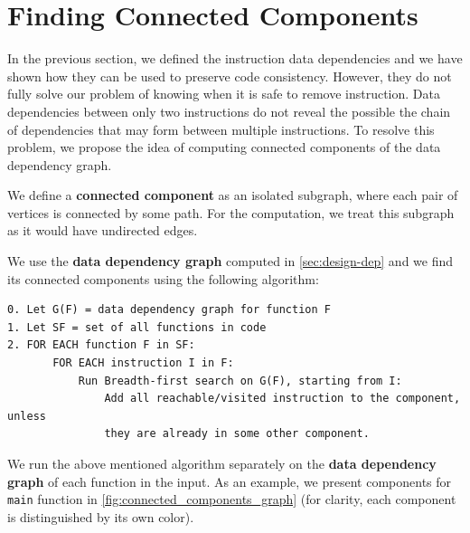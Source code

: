 \documentclass[12pt, twoside]{fithesis2}
\renewcommand{\_}{\leavevmode \kern0.07em\vbox{\hrule width0.4em}}
\begin{document}
\section{Finding Connected Components}
\label{sec:design-components}

In the previous section, we defined the instruction data
dependencies and we have shown how they can be used to preserve code consistency.
However, they do not fully solve our problem of knowing when it is safe to
remove instruction.
Data dependencies between only two instructions do not reveal the possible the
chain of dependencies that may form between multiple instructions.
To resolve this problem, we propose the idea of computing connected components
of the data dependency graph.

We define a \textbf{connected component} as an isolated subgraph, where
each pair of vertices is connected by some path. For the computation, we
treat this subgraph as it would have undirected edges.

We use the \textbf{data dependency graph} computed in \autoref{sec:design-dep}
and we find its connected components using the following algorithm:

\begin{verbatim}
0. Let G(F) = data dependency graph for function F
1. Let SF = set of all functions in code
2. FOR EACH function F in SF:
       FOR EACH instruction I in F:
           Run Breadth-first search on G(F), starting from I:
               Add all reachable/visited instruction to the component, unless
               they are already in some other component.
\end{verbatim}

We run the above mentioned algorithm separately on the \textbf{data dependency
graph} of each function in the input.
As an example, we present components for \texttt{main} function
in \autoref{fig:connected_components_graph} (for clarity, each component
is distinguished by its own color).
\end{document}
